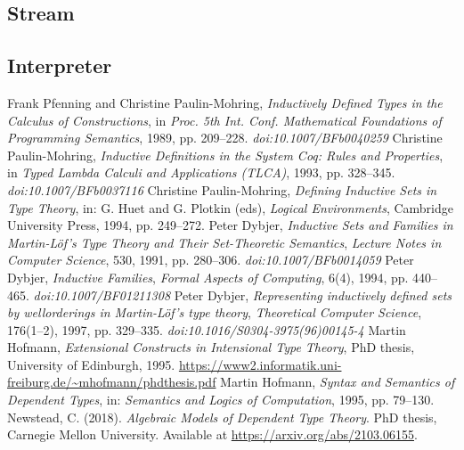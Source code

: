 \documentclass{article}
\begin{document}
\subsection{Stream}

\subsection{Interpreter}

\newpage
\begin{thebibliography}{99}


 Frank Pfenning and Christine Paulin-Mohring, \textit{Inductively Defined Types in the Calculus of Constructions}, in \textit{Proc. 5th Int. Conf. Mathematical Foundations of Programming Semantics}, 1989, pp. 209–228. \textit{doi:10.1007/BFb0040259}
 Christine Paulin-Mohring, \textit{Inductive Definitions in the System Coq: Rules and Properties}, in \textit{Typed Lambda Calculi and Applications (TLCA)}, 1993, pp. 328–345. \textit{doi:10.1007/BFb0037116}
 Christine Paulin-Mohring, \textit{Defining Inductive Sets in Type Theory}, in: G. Huet and G. Plotkin (eds), \textit{Logical Environments}, Cambridge University Press, 1994, pp. 249–272.
 Peter Dybjer, \textit{Inductive Sets and Families in Martin-Löf's Type Theory and Their Set-Theoretic Semantics}, \textit{Lecture Notes in Computer Science}, 530, 1991, pp. 280–306. \textit{doi:10.1007/BFb0014059}
 Peter Dybjer, \textit{Inductive Families}, \textit{Formal Aspects of Computing}, 6(4), 1994, pp. 440–465. \textit{doi:10.1007/BF01211308}
 Peter Dybjer, \textit{Representing inductively defined sets by wellorderings in Martin-Löf’s type theory}, \textit{Theoretical Computer Science}, 176(1–2), 1997, pp. 329–335. \textit{doi:10.1016/S0304-3975(96)00145-4}
 Martin Hofmann, \textit{Extensional Constructs in Intensional Type Theory}, PhD thesis, University of Edinburgh, 1995. \url{https://www2.informatik.uni-freiburg.de/~mhofmann/phdthesis.pdf}
 Martin Hofmann, \textit{Syntax and Semantics of Dependent Types}, in: \textit{Semantics and Logics of Computation}, 1995, pp. 79–130.
 Newstead, C. (2018). \textit{Algebraic Models of Dependent Type Theory}. PhD thesis, Carnegie Mellon University. Available at \url{https://arxiv.org/abs/2103.06155}.



\end{thebibliography}
\end{document}
